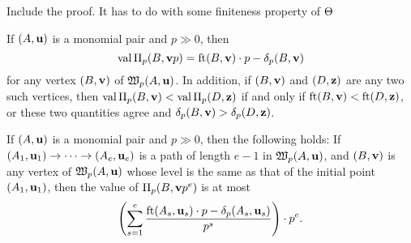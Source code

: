 \documentclass[11pt]{amsart}
\renewcommand{\!}[1]{{\color{red}\text{$\star$\,}#1\,$\star$}}
\begin{document}
\alert[inline]{Include the proof.  It has to do with some finiteness property of $\Theta$}

\begin{corollary}
If $(A, \mathbf{u})$ is a monomial pair and $p \gg 0$, then
\[ \operatorname{val} \Pi_p(B, \mathbf{v}p) = \operatorname{ft}(B, \mathbf{v}) \cdot p - \delta_p(B, \mathbf{v}) \] for any vertex $(B, \mathbf{v})$ of $\mathfrak{W}_p(A, \mathbf{u})$.    In addition, if $(B, \mathbf{v})$ and $(D, \mathbf{z})$ are any two such vertices, then $\operatorname{val} \Pi_p(B, \mathbf{v}) < \operatorname{val} \Pi_p(D, \mathbf{z})$ if and only if $\operatorname{ft}(B, \mathbf{v}) < \operatorname{ft}(D, \mathbf{z})$, or these two quantities agree and $\delta_p(B, \mathbf{v}) > \delta_p(D, \mathbf{z})$.  
\end{corollary}


\begin{theorem}
If $(A, \mathbf{u})$ is a monomial pair and $p \gg 0$, then the following holds\textup:  If 
$(A_1, \mathbf{u}_1) \to \cdots \to (A_e, \mathbf{u}_e)$ is a path of length $e-1$ in $\mathfrak{W}_p(A, \mathbf{u})$, and $(B, \mathbf{v})$ is any vertex of $\mathfrak{W}_p(A, \mathbf{u})$ whose level is the same as that of the initial point $(A_1, \mathbf{u}_1)$, then the value of $\Pi_p(B, \mathbf{v}p^e)$ is at most 
%
 \[ \left( \sum_{s=1}^e \frac{ \operatorname{ft}(A_s, \mathbf{u}_s)  \cdot p - \delta_p(A_s, \mathbf{u}_s)}{p^s} \right) \cdot p^e. \] 
\end{theorem}
\end{document}
